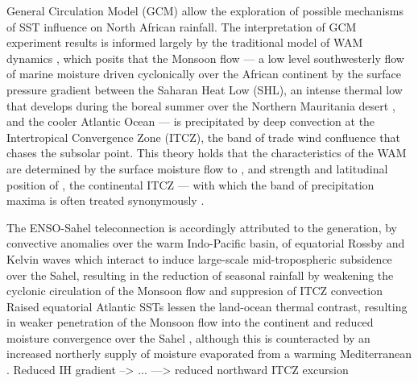 \documentclass[a4paper]{article}
\begin{document}
General Circulation Model (GCM) allow the exploration of possible mechanisms of SST influence on North African rainfall.
The interpretation of GCM experiment results is informed largely by the traditional model of WAM dynamics \parencite[see][for comprehensive descriptions]{sultan2000abrupt, sultan2003west2, ramel2006northward}, which posits that the Monsoon flow --- a low level southwesterly flow of marine moisture driven cyclonically over the African continent by the surface pressure gradient between the Saharan Heat Low (SHL), an intense thermal low that develops during the boreal summer over the Northern Mauritania desert \parencite{engelstaedter2015saharan}, and the cooler Atlantic Ocean \parencite{hall2006dynamics, grams2010atlantic} --- is precipitated by deep convection at the Intertropical Convergence Zone (ITCZ), the band of trade wind confluence that chases the subsolar point. 
This theory holds that the characteristics of the WAM are determined by the surface moisture flow to \parencite{folland1986sahel, sultan2003west1, hagos2007dynamics}, and strength and latitudinal position of \parencite{janicot1998west, damato1998characteristics, sultan2003west1}, the continental ITCZ --- with which the band of precipitation maxima is often treated synonymously \parencite[e.g.][]{shinoda1994tropical, ba1995satellite, ramel2006northward, braconnot2007results, peyrille2016annual}.

The ENSO-Sahel teleconnection is accordingly attributed to the generation, by convective anomalies over the warm Indo-Pacific basin, of equatorial Rossby and Kelvin waves which interact to induce large-scale mid-tropospheric subsidence over the Sahel, resulting in the reduction of seasonal rainfall by weakening the cyclonic circulation of the Monsoon flow and suppresion of ITCZ convection \parencite{shinoda1994tropical, rowell2001teleconnections, janicot2001intra, lu2005oceanic}
Raised equatorial Atlantic SSTs lessen the land-ocean thermal contrast, resulting in weaker penetration of the Monsoon flow into the continent and reduced moisture convergence over the Sahel \parencite{vizy2002development, giannini2003oceanic, losada2010multi}, although this is counteracted by an increased northerly supply of moisture evaporated from a warming Mediterranean \parencite{rowell2003impact, gaetani2010influence}.
Reduced IH gradient --> ... ---> reduced northward ITCZ excursion \parencite{lu2005oceanic}
\end{document}
